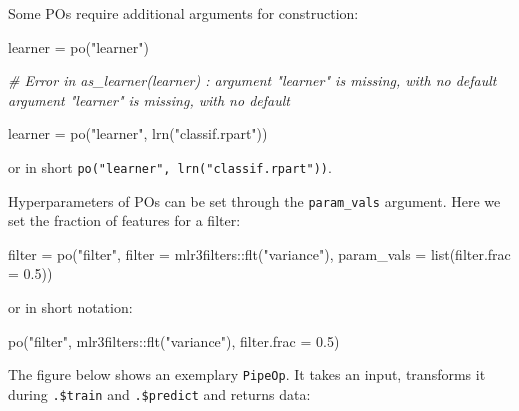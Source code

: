 \documentclass[
]{scrbook}
\newenvironment{Shaded}{\begin{snugshade}}{\end{snugshade}}
\newcommand{\AttributeTok}[1]{\textcolor[rgb]{0.77,0.63,0.00}{#1}}
\newcommand{\CommentTok}[1]{\textcolor[rgb]{0.56,0.35,0.01}{\textit{#1}}}
\newcommand{\FloatTok}[1]{\textcolor[rgb]{0.00,0.00,0.81}{#1}}
\newcommand{\FunctionTok}[1]{\textcolor[rgb]{0.00,0.00,0.00}{#1}}
\newcommand{\NormalTok}[1]{#1}
\newcommand{\OtherTok}[1]{\textcolor[rgb]{0.56,0.35,0.01}{#1}}
\newcommand{\SpecialCharTok}[1]{\textcolor[rgb]{0.00,0.00,0.00}{#1}}
\newcommand{\StringTok}[1]{\textcolor[rgb]{0.31,0.60,0.02}{#1}}
\renewenvironment{Shaded} {\begin{snugshade}\small} {\end{snugshade}}
\begin{document}
Some POs require additional arguments for construction:

\begin{Shaded}
\begin{Highlighting}[]
\NormalTok{learner }\OtherTok{=} \FunctionTok{po}\NormalTok{(}\StringTok{"learner"}\NormalTok{)}

\CommentTok{\# Error in as\_learner(learner) : argument "learner" is missing, with no default argument "learner" is missing, with no default}
\end{Highlighting}
\end{Shaded}

\begin{Shaded}
\begin{Highlighting}[]
\NormalTok{learner }\OtherTok{=} \FunctionTok{po}\NormalTok{(}\StringTok{"learner"}\NormalTok{, }\FunctionTok{lrn}\NormalTok{(}\StringTok{"classif.rpart"}\NormalTok{))}
\end{Highlighting}
\end{Shaded}

or in short \texttt{po("learner",\ lrn("classif.rpart"))}.

Hyperparameters of POs can be set through the \texttt{param\_vals} argument.
Here we set the fraction of features for a filter:

\begin{Shaded}
\begin{Highlighting}[]
\NormalTok{filter }\OtherTok{=} \FunctionTok{po}\NormalTok{(}\StringTok{"filter"}\NormalTok{,}
  \AttributeTok{filter =}\NormalTok{ mlr3filters}\SpecialCharTok{::}\FunctionTok{flt}\NormalTok{(}\StringTok{"variance"}\NormalTok{),}
  \AttributeTok{param\_vals =} \FunctionTok{list}\NormalTok{(}\AttributeTok{filter.frac =} \FloatTok{0.5}\NormalTok{))}
\end{Highlighting}
\end{Shaded}

or in short notation:

\begin{Shaded}
\begin{Highlighting}[]
\FunctionTok{po}\NormalTok{(}\StringTok{"filter"}\NormalTok{, mlr3filters}\SpecialCharTok{::}\FunctionTok{flt}\NormalTok{(}\StringTok{"variance"}\NormalTok{), }\AttributeTok{filter.frac =} \FloatTok{0.5}\NormalTok{)}
\end{Highlighting}
\end{Shaded}

The figure below shows an exemplary \texttt{PipeOp}.
It takes an input, transforms it during \texttt{.\$train} and \texttt{.\$predict} and returns data:
\end{document}
